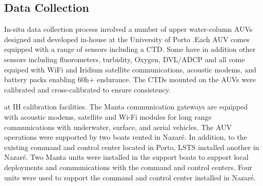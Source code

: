 \subsection{Data Collection}

In-situ data collection process involved a number of upper
water-column AUVs designed and developed in-house at the University of
Porto \cite{lauvurl}.Each AUV comes equipped with a range of sensors
including a CTD. Some have in addition other sensors including
fluorometers, turbidity, Oxygen, DVL/ADCP and all come equiped with
WiFi and Iridium satellite communications, acoustic modems, and
battery packs enabling 60h+ endurance. The CTDs mounted on the AUVs
were calibrated and cross-calibrated to ensure consistency. 

at IH calibration facilities. The
Manta communication gateways \cite{} are equipped with acoustic
modems, satellite and Wi-Fi modules for long range communications with
underwater, surface, and aerial vehicles. The AUV operations were
supported by two boats rented in Nazaré. In addition, to the existing
command and control center located in Porto, LSTS installed another in
Nazaré. Two Manta units were installed in the support boats to support
local deployments and communications with the command and control
centers. Four units were used to support the command and control
center installed in Nazaré.






